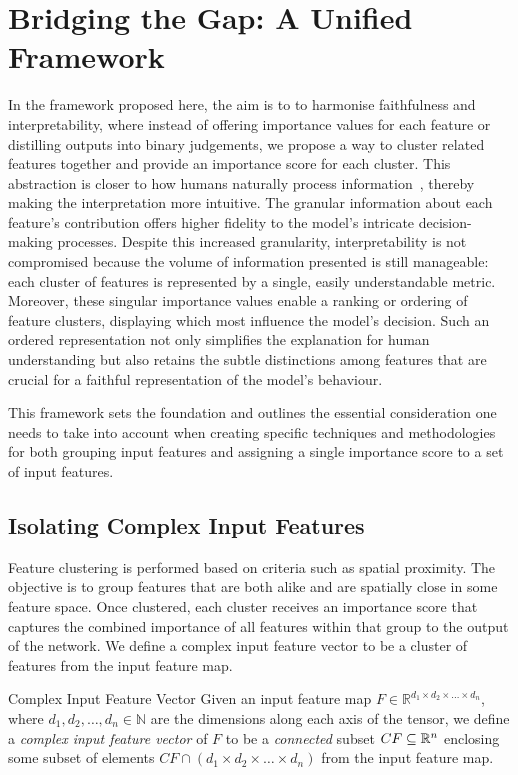 \section{Bridging the Gap: A Unified Framework}

In the framework proposed here, the aim is to to harmonise faithfulness and interpretability, where instead of offering importance values for each feature or distilling outputs into binary judgements, we propose a way to cluster related features together and provide an importance score for each cluster. This abstraction is closer to how humans naturally process information~\cite{fiantika2018internal}, thereby making the interpretation more intuitive. The granular information about each feature's contribution offers higher fidelity to the model's intricate decision-making processes. Despite this increased granularity, interpretability is not compromised because the volume of information presented is still manageable: each cluster of features is represented by a single, easily understandable metric. Moreover, these singular importance values enable a ranking or ordering of feature clusters, displaying which most influence the model's decision. Such an ordered representation not only simplifies the explanation for human understanding but also retains the subtle distinctions among features that are crucial for a faithful representation of the model's behaviour.

This framework sets the foundation and outlines the essential consideration one needs to take into account when creating specific techniques and methodologies for both grouping input features and assigning a single importance score to a set of input features. 

\subsection{Isolating Complex Input Features}

Feature clustering is performed based on criteria such as spatial proximity. The objective is to group features that are both alike and are spatially close in some feature space. Once clustered, each cluster receives an importance score that captures the combined importance of all features within that group to the output of the network. We define a complex input feature vector to be a cluster of features from the input feature map.

\begin{Definition}{Complex Input Feature Vector}{}
Given an input feature map $F \in \mathbb{R}^{d_1 \times d_2 \times \ldots \times d_n}$, where $d_1, d_2, \ldots, d_n \in \mathbb{N}$ are the dimensions along each axis of the tensor, we define a \emph{complex input feature vector} of $F$ to be a \emph{connected} subset $CF \subseteq \mathbb{R}^n$ enclosing some subset of elements $CF\cap (d_1 \times d_2 \times \ldots \times d_n)$ from the input feature map.
\end{Definition}

